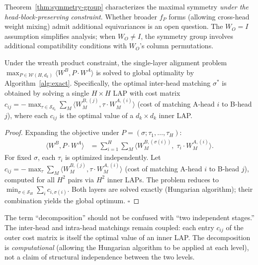 \begin{remark}\label{rmk:thm1-scope}
Theorem~\ref{thm:symmetry-group} characterizes the maximal symmetry \emph{under the head-block-preserving constraint}. Whether broader $f_P$ forms (allowing cross-head weight mixing) admit additional equivariances is an open question. The $W_O = I$ assumption simplifies analysis; when $W_O \neq I$, the symmetry group involves additional compatibility conditions with $W_O$'s column permutations.
\end{remark}

\begin{theorem}\label{thm:exact-decomposition}
Under the wreath product constraint, the single-layer alignment problem $\max_{P \in \mathcal{W}(H, d_k)} \langle W^B, P \cdot W^A \rangle$ is solved to global optimality by Algorithm~\ref{alg:exact}. Specifically, the optimal inter-head matching $\sigma^*$ is obtained by solving a single $H \times H$ LAP with cost matrix $c_{ij} = -\max_{\tau \in \mathcal{S}_{d_k}} \sum_M \langle W_M^{B,(j)}, \tau \cdot W_M^{A,(i)} \rangle$ (cost of matching A-head $i$ to B-head $j$), where each $c_{ij}$ is the optimal value of a $d_k \times d_k$ inner LAP.
\end{theorem}

\begin{proof}
Expanding the objective under $P = (\sigma; \tau_1, \ldots, \tau_H)$:
\vspace{-0.5em}
\begin{align*}
    \langle W^B, P \cdot W^A \rangle
    &= \sum_{i=1}^{H} \sum_M \langle W_M^{B,(\sigma(i))},\; \tau_i \cdot W_M^{A,(i)} \rangle.
\end{align*}
For fixed $\sigma$, each $\tau_i$ is optimized independently. Let $c_{ij} = -\max_{\tau} \sum_M \langle W_M^{B,(j)}, \tau \cdot W_M^{A,(i)} \rangle$ (cost of matching A-head $i$ to B-head $j$), computed for all $H^2$ pairs via $H^2$ inner LAPs. The problem reduces to $\min_{\sigma \in \mathcal{S}_H} \sum_i c_{i,\sigma(i)}$. Both layers are solved exactly (Hungarian algorithm); their combination yields the global optimum. \hfill $\square$
\end{proof}

\begin{remark}
The term ``decomposition'' should not be confused with ``two independent stages.'' The inter-head and intra-head matchings remain coupled: each entry $c_{ij}$ of the outer cost matrix is itself the optimal value of an inner LAP. The decomposition is \emph{computational} (allowing the Hungarian algorithm to be applied at each level), not a claim of structural independence between the two levels.
\end{remark}

